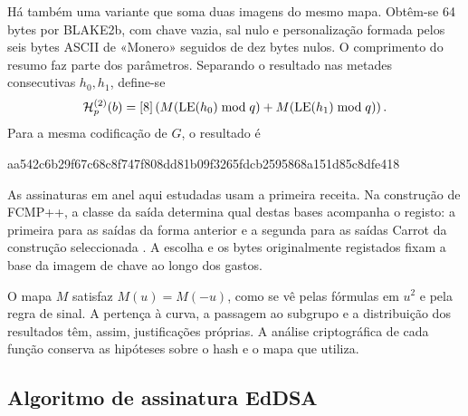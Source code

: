 Há também uma variante que soma duas imagens do mesmo mapa.
Obtêm-se 64 bytes por BLAKE2b, com chave vazia, sal nulo e
personalização formada pelos seis bytes ASCII de «Monero» seguidos
de dez bytes nulos. O comprimento do resumo faz parte dos parâmetros.
Separando o resultado nas metades consecutivas \(h_0,h_1\), define-se
\begin{equation}
 \mathcal H_p^{(2)}(b)
   =[8]\left(
       M(\operatorname{LE}(h_0)\bmod q)
       +M(\operatorname{LE}(h_1)\bmod q)\right).
 \label{eq:hash-to-point-two}
\index{blake2b@BLAKE2b}
\index{h p 2@\(\mathcal H_p^{(2)}\), receita por BLAKE2b}
\end{equation}
Para a mesma codificação de \(G\), o resultado é
\begin{center}
\small\ttfamily
aa542c6b29f67c68c8f747f808dd81b09f3265fdcb2595868a151d85c8dfe418
\end{center}
As assinaturas em anel aqui estudadas usam a primeira receita.
Na construção de FCMP++, a classe da saída determina qual destas
bases acompanha o registo: a primeira para as saídas da forma anterior
e a segunda para as saídas Carrot da construção seleccionada
\cite{monero-point-maps,monero-source-current-fcmp-tree}.
A escolha e os bytes originalmente registados fixam a base da imagem
de chave ao longo dos gastos.

O mapa \(M\) satisfaz \(M(u)=M(-u)\), como se vê pelas fórmulas em
\(u^2\) e pela regra de sinal. A pertença à curva, a passagem ao
subgrupo e a distribuição dos resultados têm, assim, justificações
próprias. A análise criptográfica de cada função conserva as hipóteses
sobre o hash e o mapa que utiliza.

\subsection{Algoritmo de assinatura EdDSA}
\label{EdDSA_section}

